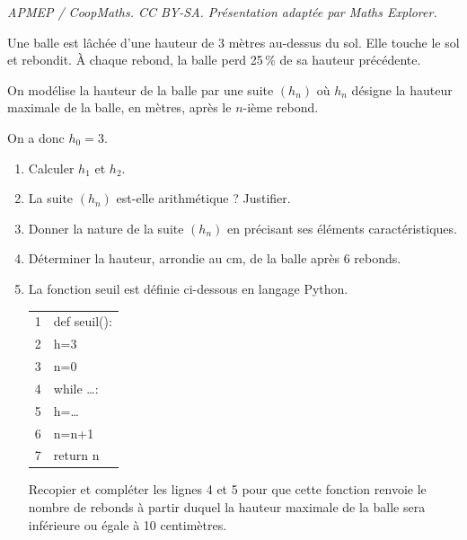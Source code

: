 \documentclass[10pt]{article}
\providecommand{\dotfill}{\ldots}
\begin{document}
\noindent\textit{APMEP / CoopMaths. CC BY-SA. Présentation adaptée par Maths Explorer.}\par\medskip
\medskip

Une balle est lâchée d'une hauteur de 3 mètres au-dessus du sol. Elle touche le sol et rebondit. À chaque rebond, la balle perd 25\,\% de sa hauteur précédente.

On modélise la hauteur de la balle par une suite $\left(h_n\right)$ où $h_n$ désigne la hauteur maximale de la balle, en mètres, après le $n$-ième rebond. 

On a donc $h_0=3$.

\medskip

\begin{enumerate}
\item  Calculer $h_1$ et $h_2$.
\item La suite $\left(h_n\right)$ est-elle arithmétique ? Justifier.
\item Donner la nature de la suite $\left(h_n\right)$ en précisant ses éléments caractéristiques.
\item Déterminer la hauteur, arrondie au cm, de la balle après 6 rebonds.
\item La fonction \og seuil \fg{} est définie ci-dessous en langage Python.

\begin{center}
\renewcommand\arraystretch{0.95}
\begin{tabular}[]{|c m{3.5cm}|}
\hline
1&def seuil():\\
2&\hspace{2em} h=3\\
3& \hspace{2em}n=0\\
4& \hspace{2em}while \dotfill :\\
5& \hspace{3.75em}h=\dotfill\\
6& \hspace{3.75em}n=n+1\\
7&\hspace{2em} return n\\\hline
\end{tabular}
\end{center}


Recopier et compléter les lignes 4 et 5 pour que cette fonction renvoie le nombre de rebonds à partir duquel la hauteur maximale de la balle sera inférieure ou égale à 10 centimètres.
\end{enumerate}

\vspace{0,5cm}
\end{document}
